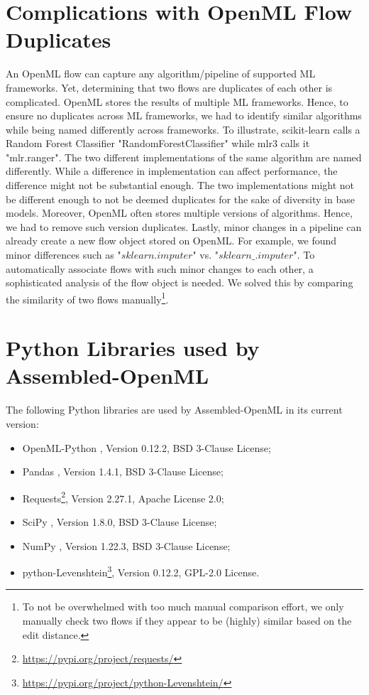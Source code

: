 \documentclass[11pt]{article}
\begin{document}
\section{Complications with OpenML Flow Duplicates}
\label{appdx:openmlflowduplciates}
An OpenML flow can capture any algorithm/pipeline of supported ML frameworks.
Yet, determining that two flows are duplicates of each other is complicated. 
OpenML stores the results of multiple ML frameworks. 
Hence, to ensure no duplicates across ML frameworks, we had to identify similar algorithms while being named differently across frameworks. To illustrate, scikit-learn calls a Random Forest Classifier "RandomForestClassifier" while mlr3 calls it "mlr.ranger". The two different implementations of the same algorithm are named differently. While a difference in implementation can affect performance, the difference might not be substantial enough.
The two implementations might not be different enough to not be deemed duplicates for the sake of diversity in base models.   
Moreover, OpenML often stores multiple versions of algorithms. Hence, we had to remove such version duplicates.
Lastly, minor changes in a pipeline can already create a new flow object stored on OpenML. 
For example, we found minor differences such as "$sklearn.imputer$" vs. "$sklearn\_.imputer$". 
To automatically associate flows with such minor changes to each other, a sophisticated analysis of the flow object is needed. We solved this by comparing the similarity of two flows manually\footnote{To not be overwhelmed with too much manual comparison effort, we only manually check two flows if they appear to be (highly) similar based on the edit distance.}. 

\section{Python Libraries used by Assembled-OpenML}
\label{appdx:usedtools}
The following Python libraries are used by Assembled-OpenML in its current version:
\begin{itemize}
    \item OpenML-Python \citep{feurer-arxiv19a}, Version 0.12.2, BSD 3-Clause License;
    \item Pandas \citep{reback2020pandas}, Version 1.4.1, BSD 3-Clause License;
    \item Requests\footnote{\url{https://pypi.org/project/requests/}}, Version 2.27.1, Apache License 2.0;
    \item SciPy \citep{2020SciPy-NMeth}, Version 1.8.0, BSD 3-Clause License;
    \item NumPy \citep{harris2020array}, Version 1.22.3, BSD 3-Clause License;
    \item python-Levenshtein\footnote{\url{https://pypi.org/project/python-Levenshtein/}}, Version 0.12.2,  GPL-2.0 License.

\end{itemize}
\end{document}
